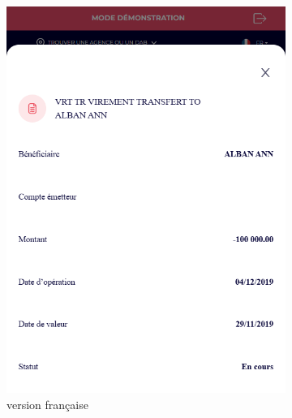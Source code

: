 \newpage

\begin{figure}[!ht]
    \centering
    \begin{subfigure}[b]{0.49\textwidth}
        \centering
        \includegraphics[width=\textwidth]{images/screens/cartes/mob-details.png}
        \caption{version française}
    \end{subfigure}
    \hfill
    \begin{subfigure}[b]{0.49\textwidth}
        \centering

\end{subfigure}
\end{figure}

